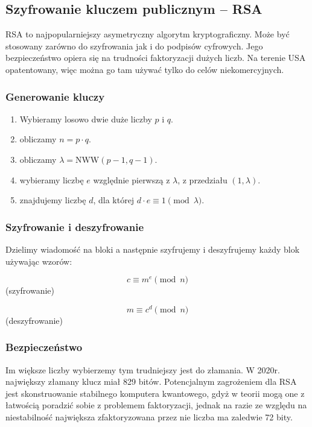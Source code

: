 \subsection{Szyfrowanie kluczem publicznym -- RSA}
RSA to najpopularniejszy asymetryczny algorytm kryptograficzny. Może być stosowany zarówno do szyfrowania jak i do podpisów cyfrowych. Jego bezpieczeństwo opiera się na trudności faktoryzacji dużych liczb. Na terenie USA opatentowany, więc można go tam używać tylko do celów niekomercyjnych.

\subsubsection{Generowanie kluczy}
\begin{enumerate}
	\item Wybieramy losowo dwie duże liczby \(p\) i \(q\).
	\item obliczamy \(n=p\cdot q\).
	\item obliczamy \(\lambda = \mathrm{NWW}(p-1, q-1)\).
	\item wybieramy liczbę \(e\) względnie pierwszą z \(\lambda\), z przedziału \((1,\lambda)\).
	\item znajdujemy liczbę \(d\), dla której \(d\cdot e \equiv 1 \pmod \lambda\).
\end{enumerate}

\subsubsection{Szyfrowanie i deszyfrowanie}
Dzielimy wiadomość na bloki a następnie szyfrujemy i deszyfrujemy każdy blok używając wzorów:
\begin{multicols}{2}
	\begin{center}
		\[c \equiv m^e \pmod{n}\]
		(szyfrowanie)
	\end{center}
	\begin{center}
		\[m \equiv c^d \pmod{n}\]
		(deszyfrowanie)
	\end{center}
\end{multicols}

\subsubsection{Bezpieczeństwo}
Im większe liczby wybierzemy tym trudniejszy jest do złamania. W 2020r. największy złamany klucz miał 829 bitów. Potencjalnym zagrożeniem dla RSA jest skonstruowanie stabilnego komputera kwantowego, gdyż w teorii mogą one z łatwością poradzić sobie z problemem faktoryzacji, jednak na razie ze względu na niestabilność największa zfaktoryzowana przez nie liczba ma zaledwie 72 bity.


